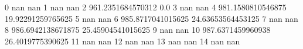 0 nan nan
1 nan nan
2 961.2351684570312 0.0
3 nan nan
4 981.1580810546875 19.92291259765625
5 nan nan
6 985.8717041015625 24.63653564453125
7 nan nan
8 986.6942138671875 25.45904541015625
9 nan nan
10 987.6371459960938 26.4019775390625
11 nan nan
12 nan nan
13 nan nan
14 nan nan
